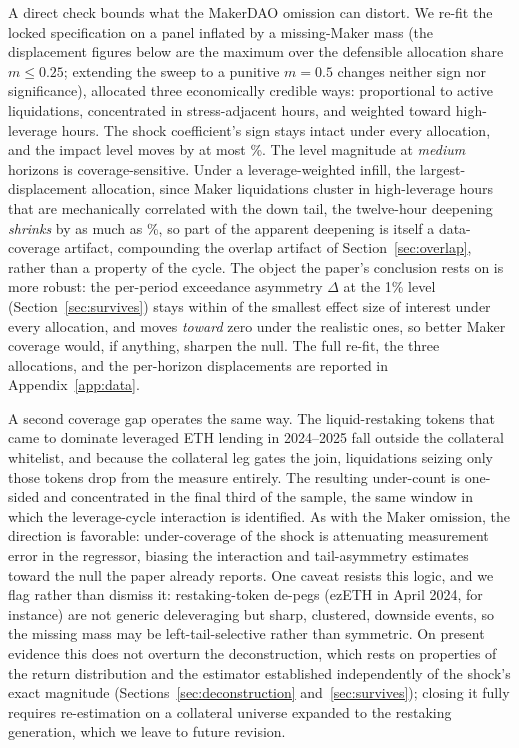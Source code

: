 A direct check bounds what the MakerDAO omission can distort. We re-fit the
locked specification on a panel inflated by a missing-Maker mass (the
displacement figures below are the maximum over the defensible allocation
share $m \le 0.25$; extending the sweep to a punitive $m=0.5$ changes
neither sign nor significance),
allocated three economically credible ways: proportional to active
liquidations, concentrated in stress-adjacent hours, and weighted toward
high-leverage hours. The shock coefficient's sign stays intact under
every allocation, and the impact level moves by at most \MakerLevelImpactPct\%.
The level magnitude at \emph{medium} horizons is coverage-sensitive.
Under a leverage-weighted infill, the largest-displacement allocation, since
Maker liquidations cluster in high-leverage hours that are mechanically
correlated with the down tail, the twelve-hour deepening \emph{shrinks} by
as much as \MakerLevelMediumPct\%, so part of the apparent deepening is itself
a data-coverage artifact, compounding the overlap artifact of Section~\ref{sec:overlap}, rather than a property of the cycle. The object the paper's
conclusion rests on is more robust: the per-period exceedance asymmetry
$\Delta$ at the 1\% level (Section~\ref{sec:survives}) stays within
\MakerExcOverSesoi{} of the smallest effect size of interest under every
allocation, and moves \emph{toward} zero under the realistic ones, so
better Maker coverage would, if anything, sharpen the null. The full re-fit,
the three allocations, and the per-horizon displacements are reported in
Appendix~\ref{app:data}.

A second coverage gap operates the same way. The liquid-restaking tokens
that came to dominate leveraged ETH lending in 2024--2025 fall outside the
collateral whitelist, and because the collateral leg gates the join,
liquidations seizing only those tokens drop from the measure entirely. The
resulting under-count is one-sided and concentrated in the final third of the
sample, the same window in which the leverage-cycle interaction is identified.
As with the Maker omission, the direction is favorable: under-coverage of the
shock is attenuating measurement error in the regressor, biasing the
interaction and tail-asymmetry estimates toward the null the paper already
reports. One caveat resists this logic, and we flag rather than dismiss it:
restaking-token de-pegs (ezETH in April 2024, for instance) are not generic
deleveraging but sharp, clustered, downside events, so the missing mass may be
left-tail-selective rather than symmetric. On present evidence this does not
overturn the deconstruction, which rests on properties of the return
distribution and the estimator established independently of the shock's exact
magnitude (Sections~\ref{sec:deconstruction} and~\ref{sec:survives}); closing
it fully requires re-estimation on a collateral universe expanded to the
restaking generation, which we leave to future revision.


